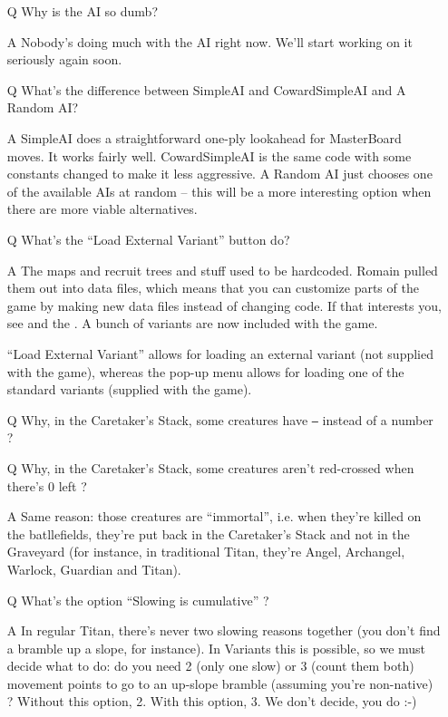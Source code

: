 \documentclass{article}
\begin{document}
\begin{itemize}
\item[Q] Why is the AI so dumb?

\item[A] Nobody's doing much with the AI right now.  We'll start working
 on it seriously again soon.


\item[Q] What's the difference between SimpleAI and CowardSimpleAI and
 A Random AI?

\item[A] SimpleAI does a straightforward one-ply lookahead for MasterBoard
 moves. It works fairly well.  CowardSimpleAI is the same code with some
 constants changed to make it less aggressive.  A Random AI just chooses one
 of the available AIs at random -- this will be a more interesting option
 when there are more viable alternatives.


\item[Q] What's the ``Load External Variant'' button do? 

\item[A] The maps and recruit trees and stuff used to be hardcoded. Romain
 pulled them out into data files, which means that you can customize parts 
 of the game by making new data files instead of changing code. If that 
 interests you, see
 and the
 .
 A bunch of variants are now included with the game.

 ``Load External Variant'' allows for loading an external variant
 (not supplied with the game), whereas the pop-up menu allows
 for loading one of the standard variants (supplied with the game).

\item[Q] Why, in the Caretaker's Stack, some creatures have \texttt{--}
 instead of a number ?
\item[Q] Why, in the Caretaker's Stack, some creatures aren't red-crossed
 when there's 0 left ?

\item[A] Same reason: those creatures are ``immortal'', i.e. when they're
 killed on the batllefields, they're put back in the Caretaker's Stack
 and not in the Graveyard (for instance, in traditional Titan, they're
 Angel, Archangel, Warlock, Guardian and Titan).

\item[Q] What's the option ``Slowing is cumulative'' ?

\item[A] In regular Titan, there's never two slowing reasons together
(you don't find a bramble up a slope, for instance). In Variants this is
possible, so we must decide what to do: do you need 2 (only one slow) or 3 (count them both) movement points to go to an up-slope bramble (assuming you're
non-native) ? Without this option, 2. With this option, 3. We don't decide,
you do :-)


\end{itemize}
\end{document}
